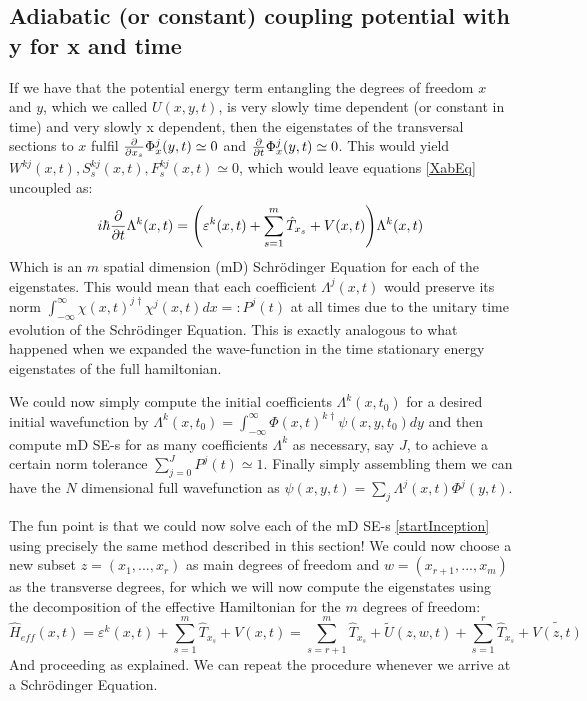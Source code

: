 \documentclass[11pt, a4paper]{article} %
\begin{document}
\subsection{Adiabatic (or constant) coupling potential with y for x and time}
If we have that the potential energy term entangling the degrees of freedom $x$ and $y$, which we called $U(x,y,t)$, is very slowly time dependent (or constant in time) and very slowly x dependent, then the eigenstates of the transversal sections to $x$ fulfil $\pdv{}{x_s}\Phi^j_x(y,t)\simeq 0$ and $\pdv{}{t}\Phi^j_x(y,t)\simeq 0$. This would yield $W^{kj}(x,t),S^{kj}_s(x,t),F^{kj}_s(x,t)\simeq 0$, which would leave equations \eqref{XabEq} uncoupled as:
\begin{equation}\label{startInception}
i\hbar \pdv{}{t}\Lambda^k(x,t) = \qty( \varepsilon^k(x,t) + \sum_{s=1}^m\hat{T}_{x_s} +V(x,t))\Lambda^k(x,t)
\end{equation}
Which is an $m$ spatial dimension (mD) Schrödinger Equation for each of the eigenstates. This would mean that each coefficient $\Lambda^j(x,t)$ would preserve its norm $\int_{-\infty}^{\infty}\chi(x,t)^{j\dagger}\chi^j(x,t) dx =: P^j(t)$ at all times due to the unitary time evolution of the Schrödinger Equation. This is exactly analogous to what happened when we expanded the wave-function in the time stationary energy eigenstates of the full hamiltonian.

We could now simply compute the initial coefficients $\Lambda^k(x,t_0)$ for a desired initial wavefunction by $\Lambda^k(x,t_0)=\int_{-\infty}^{\infty}\Phi(x,t)^{k\dagger} \psi(x,y,t_0)dy$ and then compute mD SE-s for as many coefficients $\Lambda^k$ as necessary, say $J$, to achieve a certain norm tolerance $\sum_{j=0}^J P^j(t) \simeq 1$. Finally simply assembling them we can have the $N$ dimensional full wavefunction as $\psi(x,y,t)=\sum_j\Lambda^j(x,t)\Phi^j(y,t)$.

The fun point is that we could now solve each of the mD SE-s \eqref{startInception} using precisely the same method described in this section! We could now choose a new subset $z=(x_1,...,x_r)$ as main degrees of freedom and $w=(x_{r+1},...,x_m)$ as the transverse degrees, for which we will now compute the eigenstates using the decomposition of the effective Hamiltonian for the $m$ degrees of freedom:
$$
\hat{H}_{eff}(x,t)=\varepsilon^k(x,t) + \sum_{s=1}^m\hat{T}_{x_s} +V(x,t) = \sum_{s=r+1}^m\hat{T}_{x_s}+\tilde{U}(z,w,t) +\sum_{s=1}^r\hat{T}_{x_s} +\tilde{V(z,t)}
$$
And proceeding as explained. We can repeat the procedure whenever we arrive at a Schrödinger Equation.
\end{document}
